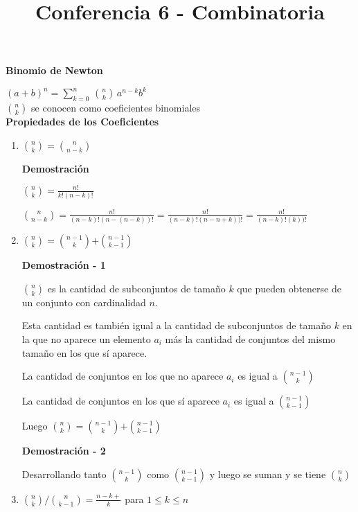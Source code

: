 \documentclass[a4paper,12pt]{report}
\title{Conferencia 6 - Combinatoria}
\author{}
\begin{document}
\maketitle



\textbf{Binomio de Newton}


$(a+b)^n=\sum^n_{k=0}\,$${n}\choose{k}$$\, a^{n-k}b^k$\\

${n}\choose{k}$ se conocen como coeficientes binomiales\\

\textbf{Propiedades de los Coeficientes}

\begin{enumerate}
 \item ${n}\choose{k}$$=$${n}\choose{n-k}$
 
 \textbf{Demostración}
 
 ${n}\choose{k}$$=\frac{n!}{k!(n-k)!}$  
 
 ${n}\choose{n-k}$$=\frac{n!}{(n-k)!(n-(n-k))!}=\frac{n!}{(n-k)!(n-n+k))!}=\frac{n!}{(n-k)!(k))!}$  
 
 \item ${n}\choose{k}$$=$${n-1}\choose{k}$$+$${n-1}\choose{k-1}$
 
 \textbf{Demostración - 1}
 
 ${n}\choose{k}$ es la cantidad de subconjuntos de tamaño $k$ que pueden obtenerse de un conjunto con cardinalidad $n$.
 
 Esta cantidad es también igual a la cantidad de subconjuntos de tamaño $k$ en la que no aparece un elemento $a_i$ más la cantidad de conjuntos del mismo tamaño en los que sí aparece.
 
 La cantidad de conjuntos en los que no aparece $a_i$ es igual a ${n-1}\choose{k}$
 
 La cantidad de conjuntos en los que sí aparece $a_i$ es igual a ${n-1}\choose{k-1}$
 
 Luego ${n}\choose{k}$$=$${n-1}\choose{k}$$+$${n-1}\choose{k-1}$
 
 \textbf{Demostración - 2}
 
 Desarrollando tanto ${n-1}\choose{k}$ como ${n-1}\choose{k-1}$ y luego se suman y se tiene
 ${n}\choose{k}$
 
 \item ${n}\choose{k}$$/$${n}\choose{k-1}$$=\frac{n-k+}{k}$ para $1\leq k \leq n$\\
 

\end{enumerate}
\end{document}

